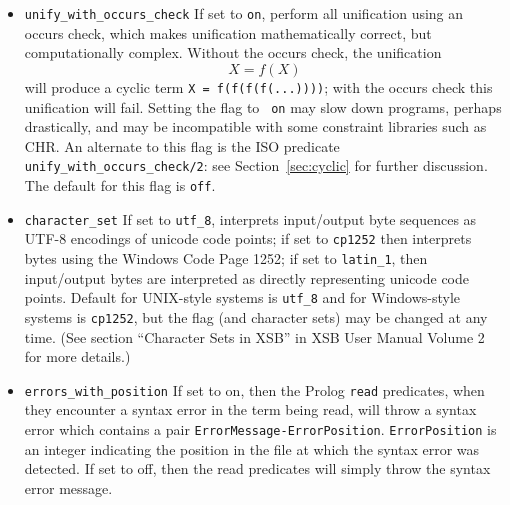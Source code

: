 \begin{description}
\begin{itemize}
\item {\tt unify\_with\_occurs\_check} If set to {\tt on}, perform all
  unification using an occurs check, which makes unification
  mathematically correct, but computationally complex.  Without the occurs
  check, the unification 
\[
   X = f(X)
\]
  will produce a cyclic term {\tt X = f(f(f(f(...))))}; with the
  occurs check this unification will fail.  Setting the flag to {\tt
    on} may slow down programs, perhaps drastically, and may be
  incompatible with some constraint libraries such as CHR.  An
  alternate to this flag is the ISO predicate {\tt
    unify\_with\_occurs\_check/2}: see Section~\ref{sec:cyclic} for
    further discussion.  The default for this flag is {\tt off}.
%
\item {\tt character\_set} If set to {\tt utf\_8}, interprets
input/output byte sequences as UTF-8 encodings of unicode code points;
if set to {\tt cp1252} then interprets bytes using the Windows Code
Page 1252; if set to {\tt latin\_1}, then input/output bytes are
interpreted as directly representing unicode code points.  Default for
UNIX-style systems is {\tt utf\_8} and for Windows-style systems is
{\tt cp1252}, but the flag (and character sets) may be changed at any
time.  (See section ``Character Sets in XSB'' in XSB User Manual
Volume 2 for more details.)
%
\item {\tt errors\_with\_position} If set to on, then the Prolog
{\tt read} predicates, when they encounter a syntax error in the term
being read, will throw a syntax error which contains a pair
\texttt{ErrorMessage-ErrorPosition}.  {\tt ErrorPosition} is an integer
indicating the position in the file at which the syntax error was
detected. If set to off, then the read predicates will simply throw
the syntax error message.


\end{itemize}
\end{description}
